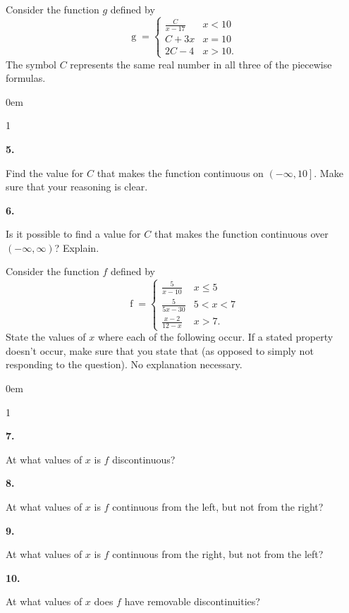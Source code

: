 \documentclass[12pt,]{book}
\newcommand{\lt}{<}
\newcommand{\gt}{>}
\theoremstyle{plain}
\theoremstyle{definition}
\numberwithin{equation}{section}
\newenvironment{exercisegroup}%
{\medskip\noindent}%
{\par\bigskip}%
\newlength{\exercisegroupindent}%
\newlength{\exercisegroupitemwidth}%
\newenvironment{exercisegrouplist}%
{\vspace{-\partopsep}%
\begin{adjustwidth}{\exercisegroupindent}{0em}}%
{\end{adjustwidth}%
\vspace{-\partopsep}%
\vspace{\baselineskip}}%
\newenvironment{exercisegroupbycol}[1]%
{\begin{exercisegrouplist}%
\vspace{-\multicolsep}%
\begin{multicols}{#1}%
\setlength{\parindent}{0em}%
\setlength{\exercisegroupitemwidth}{\linewidth}}%
{\end{multicols}%
\vspace{-\multicolsep}%
\end{exercisegrouplist}}%
\newenvironment{exercisegroupitem}[1]%
{\begin{minipage}[t]{\exercisegroupitemwidth}
\vspace{0pt}%
{\bfseries#1}%
\rule{0pt}{\baselineskip}}{\strut%
\end{minipage}%
\hspace{\columnsep}}%
\providecommand\phantomsection{}
\newcommand{\fe}[2]{\mathop{{#1}{\left(#2\right)}}}
\newcommand{\ointerval}[2]{\left(#1,#2\right)}
\newcommand{\ocinterval}[2]{\left(\left.#1,#2\right]\right.}
\begin{document}
\begin{exercisegroup}%
Consider the function \(g\) defined by \[\fe{g}{x}=\begin{cases}\frac{C}{x-17}&x\lt10\\C+3x&x=10\\2C-4&x\gt10\text{.}\end{cases}\] The symbol \(C\) represents the same real number in all three of the piecewise formulas.%
\begin{exercisegroupbycol}{1}%
\begin{exercisegroupitem}{5. }\phantomsection\hypertarget{exercise-116}{\null}
Find the value for \(C\) that makes the function continuous on \(\ocinterval{-\infty}{10}\). Make sure that your reasoning is clear.%
\end{exercisegroupitem}%
\par%
\begin{exercisegroupitem}{6. }\phantomsection\hypertarget{exercise-117}{\null}
Is it possible to find a value for \(C\) that makes the function continuous over \(\ointerval{-\infty}{\infty}\)? Explain.%
\end{exercisegroupitem}%
\par%
\end{exercisegroupbycol}%
\end{exercisegroup}%
\begin{exercisegroup}%
Consider the function \(f\) defined by \[\fe{f}{x}=\begin{cases}\frac{5}{x-10}&x\leq5\\\frac{5}{5x-30}&5\lt x\lt7\\\frac{x-2}{12-x}&x>7\text{.}\end{cases}\] State the values of \(x\) where each of the following occur. If a stated property doesn't occur, make sure that you state that (as opposed to simply not responding to the question). No explanation necessary.%
\begin{exercisegroupbycol}{1}%
\begin{exercisegroupitem}{7. }\phantomsection\hypertarget{exercise-118}{\null}
At what values of \(x\) is \(f\) discontinuous?%
\end{exercisegroupitem}%
\par%
\begin{exercisegroupitem}{8. }\phantomsection\hypertarget{exercise-119}{\null}
At what values of \(x\) is \(f\) continuous from the left, but not from the right?%
\end{exercisegroupitem}%
\par%
\begin{exercisegroupitem}{9. }\phantomsection\hypertarget{exercise-120}{\null}
At what values of \(x\) is \(f\) continuous from the right, but not from the left?%
\end{exercisegroupitem}%
\par%
\begin{exercisegroupitem}{10. }\phantomsection\hypertarget{exercise-121}{\null}
At what values of \(x\) does \(f\) have removable discontinuities?%
\end{exercisegroupitem}%
\par%
\end{exercisegroupbycol}%
\end{exercisegroup}%
\end{document}
